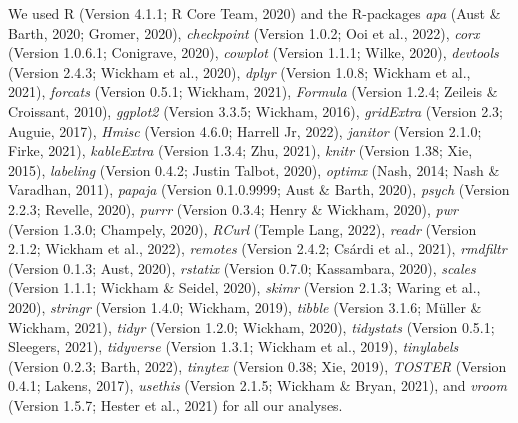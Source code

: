 \documentclass[
  man,floatsintext]{apa7}
\begin{document}
We used R (Version 4.1.1; R Core Team, 2020) and the R-packages \emph{apa} (Aust \& Barth, 2020; Gromer, 2020), \emph{checkpoint} (Version 1.0.2; Ooi et al., 2022), \emph{corx} (Version 1.0.6.1; Conigrave, 2020), \emph{cowplot} (Version 1.1.1; Wilke, 2020), \emph{devtools} (Version 2.4.3; Wickham et al., 2020), \emph{dplyr} (Version 1.0.8; Wickham et al., 2021), \emph{forcats} (Version 0.5.1; Wickham, 2021), \emph{Formula} (Version 1.2.4; Zeileis \& Croissant, 2010), \emph{ggplot2} (Version 3.3.5; Wickham, 2016), \emph{gridExtra} (Version 2.3; Auguie, 2017), \emph{Hmisc} (Version 4.6.0; Harrell Jr, 2022), \emph{janitor} (Version 2.1.0; Firke, 2021), \emph{kableExtra} (Version 1.3.4; Zhu, 2021), \emph{knitr} (Version 1.38; Xie, 2015), \emph{labeling} (Version 0.4.2; Justin Talbot, 2020), \emph{optimx} (Nash, 2014; Nash \& Varadhan, 2011), \emph{papaja} (Version 0.1.0.9999; Aust \& Barth, 2020), \emph{psych} (Version 2.2.3; Revelle, 2020), \emph{purrr} (Version 0.3.4; Henry \& Wickham, 2020), \emph{pwr} (Version 1.3.0; Champely, 2020), \emph{RCurl} (Temple Lang, 2022), \emph{readr} (Version 2.1.2; Wickham et al., 2022), \emph{remotes} (Version 2.4.2; Csárdi et al., 2021), \emph{rmdfiltr} (Version 0.1.3; Aust, 2020), \emph{rstatix} (Version 0.7.0; Kassambara, 2020), \emph{scales} (Version 1.1.1; Wickham \& Seidel, 2020), \emph{skimr} (Version 2.1.3; Waring et al., 2020), \emph{stringr} (Version 1.4.0; Wickham, 2019), \emph{tibble} (Version 3.1.6; Müller \& Wickham, 2021), \emph{tidyr} (Version 1.2.0; Wickham, 2020), \emph{tidystats} (Version 0.5.1; Sleegers, 2021), \emph{tidyverse} (Version 1.3.1; Wickham et al., 2019), \emph{tinylabels} (Version 0.2.3; Barth, 2022), \emph{tinytex} (Version 0.38; Xie, 2019), \emph{TOSTER} (Version 0.4.1; Lakens, 2017), \emph{usethis} (Version 2.1.5; Wickham \& Bryan, 2021), and \emph{vroom} (Version 1.5.7; Hester et al., 2021) for all our analyses.
\end{document}
